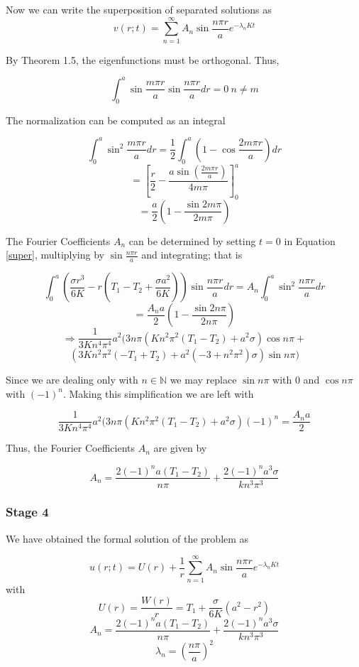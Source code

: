 \documentclass[12pt]{article}
\begin{document}
Now we can write the superposition of separated solutions as
\begin{equation}\label{super}v(r;t)=\sum_{n=1}^\infty A_n \sin{\frac{n\pi r}{a}} e^{-\lambda_n K t}\end{equation}

By Theorem 1.5\cite[Page 86]{pinsky}, the eigenfunctions must be orthogonal. Thus,

\[\int_0^a \sin{\frac{m\pi r}{a}} \sin{\frac{n\pi r}{a}} dr =0 \ n\neq m\]


The normalization can be computed as an integral

\[\int_0^a \sin^2{\frac{m\pi r}{a}}  dr = \frac{1}{2} \int_0^a \left(1- \cos{ \frac{2 m\pi r}{a}} \right) dr\]
\[= \left[\frac{r}{2}-\frac{a \sin{\left(\frac{2 m \pi  r}{a}\right)}}{4 m \pi }\right]_0^a \]
\[=\frac{a}{2} \left(1-\frac{ \sin{2 m \pi }}{2 m \pi }\right)\]

The Fourier Coefficients $A_n$ can be determined by setting $t=0$ in Equation \ref{super}, multiplying by $\sin{\frac{n\pi r}{a}}$ and integrating; that is

\[\int_0^a\left(\frac{\sigma r^3}{6K}-r\left(T_1-T_2+\frac{\sigma a^2}{6K} \right) \right) \sin{\frac{n\pi r}{a}}dr = A_n \int_0^a \sin^2{\frac{n\pi r}{a}}  dr \]
\[=\frac{A_n a}{2} \left(1-\frac{ \sin{2 n \pi }}{2 n \pi }\right)\]
\[\Rightarrow \frac{1}{3 K n^4 \pi ^4}a^2 (3 n \pi  \left(K n^2 \pi ^2 (T_1-T_2)+a^2 \sigma \right) \cos{n \pi }+\]
\[\left(3 K n^2 \pi ^2 (-T_1+T_2)+a^2 \left(-3+n^2 \pi ^2\right) \sigma \right) \sin{n \pi})\]

Since we are dealing only with $n \in \mathbb{N}$ we may replace $\sin{n\pi}$ with $0$ and $\cos{n\pi}$ with $(-1)^n$. Making this simplification we are left with

\[\frac{1}{3 K n^4 \pi ^4}a^2 (3 n \pi  \left(K n^2 \pi ^2 (T_1-T_2)+a^2 \sigma \right) (-1)^n=\frac{A_n a}{2} \]

Thus, the Fourier Coefficients $A_n$ are given by

\[A_n = \frac{2 (-1)^n a(T_1-T_2)}{n \pi }+\frac{2 (-1)^n a^3 \sigma }{k n^3 \pi ^3}\]


\subsubsection{Stage 4}

We have obtained the formal solution of the problem as 

\[ u(r;t)=U(r)+\frac{1}{r}\sum_{n=1}^\infty A_n \sin{\frac{n\pi r}{a}} e^{-\lambda_n K t}\]
with
\[U(r)=\frac{W(r)}{r}=T_1+\frac{\sigma}{6K}(a^2-r^2)\]
\[A_n = \frac{2 (-1)^n a(T_1-T_2)}{n \pi }+\frac{2 (-1)^n a^3 \sigma }{k n^3 \pi ^3}\]
\[\lambda_n=\left(\frac{n\pi}{a}\right)^2\]
\end{document}
